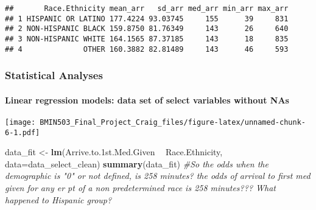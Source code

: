 \documentclass[]{article}
\newenvironment{Shaded}{\begin{snugshade}}{\end{snugshade}}
\newcommand{\KeywordTok}[1]{\textcolor[rgb]{0.13,0.29,0.53}{\textbf{#1}}}
\newcommand{\DataTypeTok}[1]{\textcolor[rgb]{0.13,0.29,0.53}{#1}}
\newcommand{\DecValTok}[1]{\textcolor[rgb]{0.00,0.00,0.81}{#1}}
\newcommand{\StringTok}[1]{\textcolor[rgb]{0.31,0.60,0.02}{#1}}
\newcommand{\CommentTok}[1]{\textcolor[rgb]{0.56,0.35,0.01}{\textit{#1}}}
\newcommand{\OperatorTok}[1]{\textcolor[rgb]{0.81,0.36,0.00}{\textbf{#1}}}
\newcommand{\NormalTok}[1]{#1}
\let\oldparagraph\paragraph
\renewcommand{\paragraph}[1]{\oldparagraph{#1}\mbox{}}
\begin{document}
\begin{verbatim}
##       Race.Ethnicity mean_arr   sd_arr med_arr min_arr max_arr
## 1 HISPANIC OR LATINO 177.4224 93.03745     155      39     831
## 2 NON-HISPANIC BLACK 159.8750 81.76349     143      26     640
## 3 NON-HISPANIC WHITE 164.1565 87.37185     143      18     835
## 4              OTHER 160.3882 82.81489     143      46     593
\end{verbatim}

\subsubsection{Statistical Analyses}\label{statistical-analyses}

\paragraph{Linear regression models: data set of select variables
without
NAs}\label{linear-regression-models-data-set-of-select-variables-without-nas}

\begin{Shaded}
\end{Shaded}

\texttt{[image: BMIN503\_Final\_Project\_Craig\_files/figure-latex/unnamed-chunk-6-1.pdf]}

\begin{Shaded}
\begin{Highlighting}[]
\NormalTok{data_fit <-}\StringTok{ }\KeywordTok{lm}\NormalTok{(Arrive.to.1st.Med.Given }\OperatorTok{~}\StringTok{ }\NormalTok{Race.Ethnicity, }\DataTypeTok{data=}\NormalTok{data_select_clean)}
\KeywordTok{summary}\NormalTok{(data_fit) }\CommentTok{#So the odds when the demographic is "0" or not defined, is 258 minutes? the odds of arrival to first med given for any er pt of a non predetermined race is 258 minutes??? What happened to Hispanic group?}
\end{Highlighting}
\end{Shaded}
\end{document}
